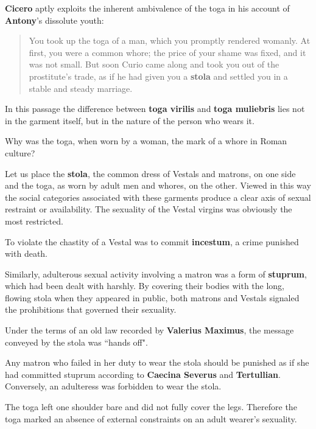 \textbf{Cicero} aptly exploits the inherent ambivalence of the toga in his account of \textbf{Antony}'s dissolute youth: 
\begin{quotation}
    You took up the toga of a man, which you promptly rendered womanly. At first, you were a common whore; the price of your shame was fixed, and it was not small. But soon Curio came along and took you out of the prostitute's trade, as if he had given you a \textbf{stola} and settled you in a stable and steady marriage.
\end{quotation}

In this passage the difference between \textbf{toga virilis} and \textbf{toga muliebris} lies not in the garment itself, but in the nature of the person who wears it.

\begin{qst}
    Why was the toga, when worn by a woman, the mark of a whore in Roman culture?
\end{qst}

Let us place the \textbf{stola}, the common dress of Vestals and matrons, on one side and the toga, as worn by adult men and whores, on the other. Viewed in this way the social categories associated with these garments produce a clear axis of sexual restraint or availability. The sexuality of the Vestal virgins was obviously the most restricted. 
\begin{rmk}
    To violate the chastity of a Vestal was to commit \textbf{incestum}, a crime punished with death.
\end{rmk}

Similarly, adulterous sexual activity involving a matron was a form of \textbf{stuprum}, which had been dealt with harshly. By covering their bodies with the long, flowing stola when they appeared in public, both matrons and Vestals signaled the prohibitions that governed their sexuality.

\begin{nte}
    Under the terms of an old law recorded by \textbf{Valerius Maximus}, the message conveyed by the stola was ``hands off".
\end{nte}


Any matron who failed in her duty to wear the stola should be punished as if she had committed stuprum according to \textbf{Caecina Severus} and \textbf{Tertullian}. Conversely, an adulteress was forbidden to wear the stola.

\begin{nte}
    The toga left one shoulder bare and did not fully cover the legs. Therefore the toga marked an absence of external constraints on an adult wearer's sexuality.
\end{nte}

